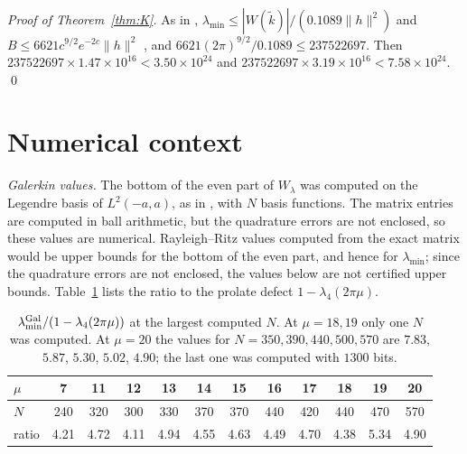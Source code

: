 \documentclass[11pt]{amsart}
\theoremstyle{remark}
\numberwithin{equation}{section}
\begin{document}
\emph{Proof of Theorem~\ref{thm:K}.} As in \cite[Section~7]{MoriWeilIII}, $\lambda_{\min}\le|W(\tilde k)|/(0.1089\|h\|^2)$ and $B\le6621c^{9/2}e^{-2c}\|h\|^2$ \cite{MoriPSWF}, and $6621(2\pi)^{9/2}/0.1089\le237522697$. Then $237522697\times1.47\times10^{16}<3.50\times10^{24}$ and $237522697\times3.19\times10^{16}<7.58\times10^{24}$. \qed

\section{Numerical context}\label{sec:num}

\emph{Galerkin values.} The bottom of the even part of $W_\lambda$ was computed on the Legendre basis of $L^2(-a,a)$, as in \cite[Section~9]{MoriWeilII}, with $N$ basis functions. The matrix entries are computed in ball arithmetic, but the quadrature errors are not enclosed, so these values are numerical. Rayleigh--Ritz values computed from the exact matrix would be upper bounds for the bottom of the even part, and hence for $\lambda_{\min}$; since the quadrature errors are not enclosed, the values below are not certified upper bounds. Table~\ref{tab:ratio} lists the ratio to the prolate defect $1-\lambda_4(2\pi\mu)$.

\begin{table}[h]
\centering\small
\begin{tabular}{lccccccccccc}
\toprule
$\mu$ & 7 & 11 & 12 & 13 & 14 & 15 & 16 & 17 & 18 & 19 & 20\\
\midrule
$N$ & 240 & 320 & 300 & 330 & 370 & 370 & 440 & 420 & 440 & 470 & 570\\
ratio & 4.21 & 4.72 & 4.11 & 4.94 & 4.55 & 4.63 & 4.49 & 4.70 & 4.38 & 5.34 & 4.90\\
\bottomrule
\end{tabular}
\caption{$\lambda_{\min}^{\rm Gal}/(1-\lambda_4(2\pi\mu))$ at the largest computed $N$. At $\mu=18,19$ only one $N$ was computed. At $\mu=20$ the values for $N=350,390,440,500,570$ are $7.83$, $5.87$, $5.30$, $5.02$, $4.90$; the last one was computed with $1300$ bits.}\label{tab:ratio}
\end{table}
\end{document}
